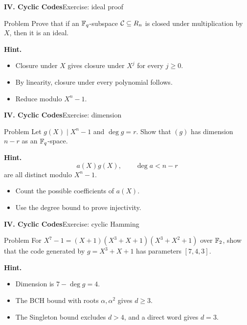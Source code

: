 \begin{frame}{\textbf{IV. Cyclic Codes}}{Exercise: ideal proof}
\small
\begin{block}{Problem}
Prove that if an $\mathbb{F}_q$-subspace $\mathcal{C}\subseteq R_n$ is closed under multiplication by $X$, then it is an ideal.
\end{block}
\textbf{Hint.}
\begin{itemize}
  \item Closure under $X$ gives closure under $X^j$ for every $j\ge0$.
  \item By linearity, closure under every polynomial follows.
  \item Reduce modulo $X^n-1$.
\end{itemize}
\end{frame}

\begin{frame}{\textbf{IV. Cyclic Codes}}{Exercise: dimension}
\small
\begin{block}{Problem}
Let $g(X)\mid X^n-1$ and $\deg g=r$. Show that $(g)$ has dimension $n-r$ as an $\mathbb{F}_q$-space.
\end{block}
\textbf{Hint.}
\[
  a(X)g(X),\qquad \deg a<n-r
\]
are all distinct modulo $X^n-1$.
\begin{itemize}
  \item Count the possible coefficients of $a(X)$.
  \item Use the degree bound to prove injectivity.
\end{itemize}
\end{frame}

\begin{frame}{\textbf{IV. Cyclic Codes}}{Exercise: cyclic Hamming}
\small
\begin{block}{Problem}
For $X^7-1=(X+1)(X^3+X+1)(X^3+X^2+1)$ over $\mathbb{F}_2$, show that the code generated by $g=X^3+X+1$ has parameters $[7,4,3]$.
\end{block}
\textbf{Hint.}
\begin{itemize}
  \item Dimension is $7-\deg g=4$.
  \item The BCH bound with roots $\alpha,\alpha^2$ gives $d\ge3$.
  \item The Singleton bound excludes $d>4$, and a direct word gives $d=3$.
\end{itemize}
\end{frame}

